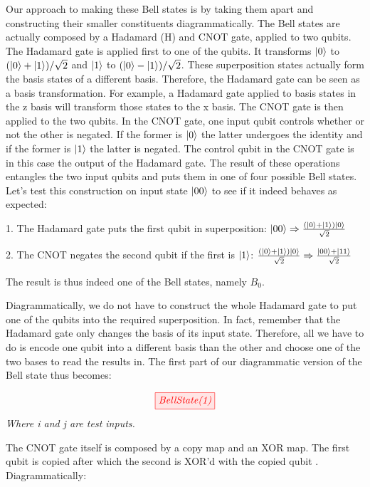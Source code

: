 \documentclass[]{article}
\begin{document}
Our approach to making these Bell states is by taking them apart and constructing their smaller constituents diagrammatically. The Bell states are actually composed by a Hadamard (H) and CNOT gate, applied to two qubits. The Hadamard gate is applied first to one of the qubits. It transforms $\ket{0}$ to  $(\ket{0} + \ket{1})/\sqrt{2}$ and $\ket{1}$ to $(\ket{0} - \ket{1})/\sqrt{2}$. These superposition states actually form the basis states of a different basis. Therefore, the Hadamard gate can be seen as a basis transformation. For example, a Hadamard gate applied to basis states in the z basis will transform those states to the x basis. The CNOT gate is then applied to the two qubits. In the CNOT gate, one input qubit controls whether or not the other is negated. If the former is $\ket{0}$ the latter undergoes the identity and if the former is $\ket{1}$ the latter is negated. The control qubit in the CNOT gate is in this case the output of the Hadamard gate. The result of these operations entangles the two input qubits and puts them in one of four possible Bell states. Let's test this construction on input state $\ket{00}$ to see if it indeed behaves as expected:

1. The Hadamard gate puts the first qubit in superposition: $\ket{00} \Rightarrow \frac{(\ket{0} + \ket{1})\ket{0}}{\sqrt{2}}$

2. The CNOT negates the second qubit if the first is $\ket{1}$: $\frac{(\ket{0} + \ket{1})\ket{0}}{\sqrt{2}} \Rightarrow \frac{\ket{00} + \ket{11}}{\sqrt{2}}$

The result is thus indeed one of the Bell states, namely $B_0$.

Diagrammatically, we do not have to construct the whole Hadamard gate to put one of the qubits into the required superposition. In fact, remember that the Hadamard gate only changes the basis of its input state. Therefore, all we have to do is encode one qubit into a different basis than the other and choose one of the two bases to read the results in. The first part of our diagrammatic version of the Bell state thus becomes:

\begin{equation}
	\label{equation:BellState(1)}
	\tikzfig{BellState(1)}
\end{equation}
\textit{Where i and j are test inputs.}

The CNOT gate itself is composed by a copy map and an XOR map. The first qubit is copied after which the second is XOR'd with the copied qubit \cite{articleCNOT}. Diagrammatically:
\end{document}
